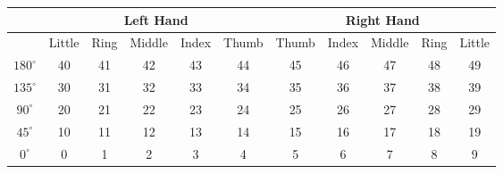 \documentclass[border=2mm]{standalone}
\begin{document}
    \begin{tabular}{|c|c|c|c|c|c|c|c|c|c|c|}
        \hline
        & \multicolumn{5}{|c|}{Left Hand} & \multicolumn{5}{c|}{Right Hand} \\
        \hline
        & Little & Ring & Middle & Index & Thumb & Thumb & Index & Middle & Ring & Little \\
        \hline
        $180^\circ$ & 40 & 41 & 42 & 43 & 44 & 45 & 46 & 47 & 48 & 49 \\
        \hline
        $135^\circ$ & 30 & 31 & 32 & 33 & 34 & 35 & 36 & 37 & 38 & 39 \\
        \hline
        $90^\circ$  & 20 & 21 & 22 & 23 & 24 & 25 & 26 & 27 & 28 & 29 \\
        \hline
        $45^\circ$  & 10 & 11 & 12 & 13 & 14 & 15 & 16 & 17 & 18 & 19 \\
        \hline
        $0^\circ$   &  0 &  1 &  2 &  3 &  4 &  5 &  6 &  7 &  8 &  9 \\
        \hline
    \end{tabular}
\end{document}

